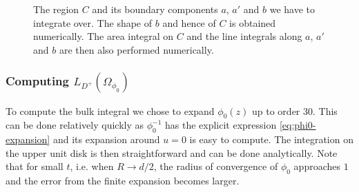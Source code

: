 \documentclass[11pt,a4paper]{article}
\numberwithin{equation}{section}
\begin{document}
\begin{figure}
    \centering
    \caption{The region $C$ and its boundary components $a$, $a'$ and $b$ we have to integrate over.
    The shape of $b$ and hence of $C$ is obtained numerically. The area integral on $C$ and the line integrals along $a$, $a'$ and $b$ are then also performed numerically.}
    \label{fig:int_region}
\end{figure}


\subsubsection*{Computing $L_{D^+}(\Omega_{\phi_0})$}

To compute the bulk integral we chose to expand $\phi_0(z)$ up to order 30. This can be done relatively quickly as $\phi^{-1}_0$ has the explicit expression \eqref{eq:phi0-expansion} and its expansion around $u=0$ is easy to compute.
The integration on the upper unit disk is then straightforward and can be done analytically. Note that for small $t$, i.e. when $R\to d/2$, the radius of convergence of $\phi_0$ approaches $1$ and the error from the finite expansion becomes larger.  


\newpage

\newcommand\arxiv[2]      {\href{http://arXiv.org/abs/#1}{#2}}
\newcommand\jdoi[2]        {\href{http://dx.doi.org/#1}{#2}}

\small
\end{document}
